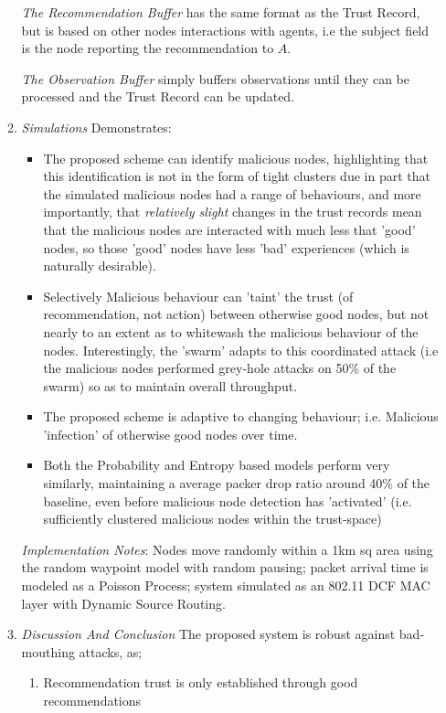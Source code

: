 \begin{itemize}
\begin{enumerate}
          \emph{The Recommendation Buffer} has the same format as the Trust Record, but is based on other nodes interactions with agents, i.e the $\text{subject}$ field is the node reporting the recommendation to $A$. 

          \emph{The Observation Buffer} simply buffers observations until they can be processed and the Trust Record can be updated.

      \item \emph{Simulations}
        Demonstrates:
        \begin{itemize}
          \item The proposed scheme can identify malicious nodes, highlighting that this identification is not in the form of tight clusters due in part that the simulated malicious nodes had a range of behaviours, and more importantly, that \emph{relatively slight} changes in the trust records mean that the malicious nodes are interacted with much less that 'good' nodes, so those 'good' nodes have less 'bad' experiences (which is naturally desirable).
          \item Selectively Malicious behaviour can 'taint' the trust (of recommendation, not action) between otherwise good nodes, but not nearly to an extent as to whitewash the malicious behaviour of the nodes. Interestingly, the 'swarm' adapts to this coordinated attack (i.e the malicious nodes performed grey-hole attacks on 50\% of the swarm) so as to maintain overall throughput.
          \item The proposed scheme is adaptive to changing behaviour; i.e. Malicious 'infection' of otherwise good nodes over time.
          \item Both the Probability and Entropy based models perform very
            similarly, maintaining a average packer drop ratio around 40\% of the baseline, even before malicious node detection has 'activated' (i.e. sufficiently clustered malicious nodes within the trust-space)
        \end{itemize}
        \emph{Implementation Notes}: Nodes move randomly within a 1km sq area using the random waypoint model with random pausing; packet arrival time is modeled as a Poisson Process; system simulated as an 802.11 DCF MAC layer with Dynamic Source Routing.
      \item \emph{Discussion And Conclusion}
      The proposed system is robust against bad-mouthing attacks, as;
      \begin{enumerate}
        \item Recommendation trust is only established through good recommendations

\end{enumerate}
\end{enumerate}
\end{itemize}
